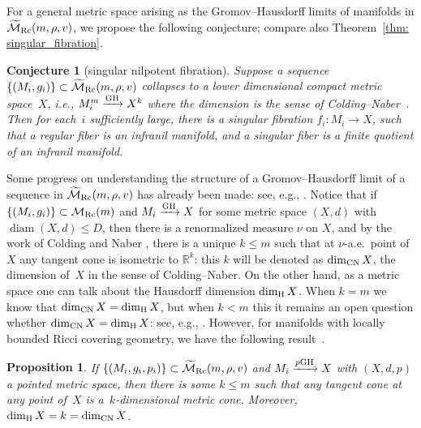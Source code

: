 \documentclass[10pt,a4paper]{amsart}
\numberwithin{equation}{section}
\newtheorem{Proposition}[Theorem]{Proposition}
\newtheorem{Conjecture}[Theorem]{Conjecture}
\DeclareMathOperator{\diam}{diam}
\begin{document}
For a general metric space arising as the Gromov--Hausdorff limits of
manifolds in \linebreak $\widetilde{\mathcal{M}}_{\rm Rc}(m,\rho,v)$, we propose the following
conjecture; compare also Theorem~\ref{thm: singular_fibration}.
\begin{Conjecture}[singular nilpotent fibration] Suppose a sequence
$ \{(M_i,g_i) \}\subset \widetilde{\mathcal{M}}_{\rm Rc}(m,\rho,v)$
collapses to a lower dimensional compact metric space~$X$, i.e.,
$M^m_i\xrightarrow{\rm GH} X^k$ where the dimension is the sense of Colding--Naber~{\rm \cite{CN12}}. Then for each~$i$ sufficiently large, there is a singular
fibration $f_i \colon M_i\to X$, such that a regular fiber is an infranil manifold,
and a singular fiber is a finite quotient of an infranil manifold.
\end{Conjecture}
Some progress on understanding the structure of a Gromov--Hausdorff limit of a
sequence in $\widetilde{\mathcal{M}}_{\rm Rc}(m,\rho,v)$ has already been made:
see, e.g., \cite{HR20}. Notice that if $ \{(M_i,g_i) \}\subset
\mathcal{M}_{\rm Rc}(m)$ and $M_i\xrightarrow{\rm GH}X$ for some metric space $(X,d)$
with $\diam (X,d)\le D$, then there is a renormalized measure $\nu$ on $X$, and
by the work of Colding and Naber \cite{CN12}, there is a unique $k\le m$ such
that at $\nu$-a.e.\ point of $X$ any tangent cone is isometric to
$\mathbb{R}^k$: this $k$ will be denoted as $\dim_{\rm CN}X$, the dimension of~$X$
in the sense of Colding--Naber. On the other hand, as a metric space one can
talk about the Hausdorff dimension $\dim_{\rm H}X$. When $k=m$ we know that
$\dim_{\rm CN}X=\dim_{\rm H}X$, but when $k<m$ this it remains an open question whether
$\dim_{\rm CN}X=\dim_{\rm H}X$: see, e.g., \cite[Open Question~1.11]{KL18}.
However, for manifolds with locally bounded Ricci covering
geometry, we have the following result~\cite{Rong18}.
\begin{Proposition}
If $ \{(M_i,g_i,p_i) \}\subset \widetilde{\mathcal{M}}_{\rm Rc}(m,\rho,v)$
and $M_i\xrightarrow{p{\rm GH}}X$ with $(X,d,p)$ a pointed metric space, then
there is some $k\le m$ such that any tangent cone at any point of~$X$ is
a~$k$-dimensional metric cone. Moreover, $\dim_{\rm H}X=k=\dim_{\rm CN}X$.
\end{Proposition}
\end{document}
